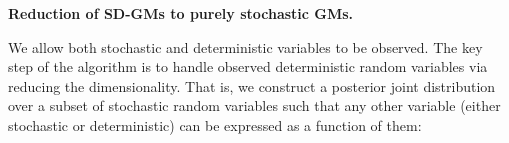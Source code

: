 \documentclass{article}
\newcommand{\tuple}[1] {\langle #1 \rangle}
\newcommand{\bvec}[1]{\textbf{#1}}
\newcommand{\pr}{p}
\begin{document}
\textbf{Reduction of SD-GMs to purely stochastic GMs.}

We allow both stochastic and deterministic variables to be observed.  
The key step of the algorithm is to handle observed deterministic random variables via reducing the dimensionality. 
That is, 
we construct a posterior joint distribution over a subset of stochastic random variables such that any other variable (either stochastic or deterministic)
can be expressed as a function of them:
\end{document}
